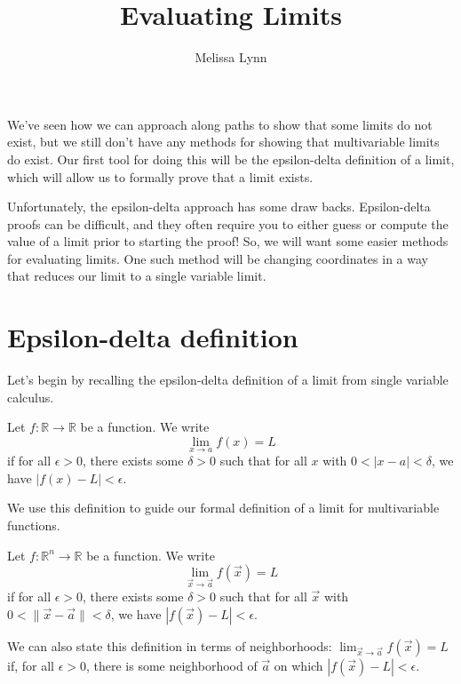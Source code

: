 \documentclass{ximera}
\title{Evaluating Limits}
\author{Melissa Lynn}
\begin{document}
\begin{abstract}
\end{abstract}
\maketitle

We've seen how we can approach along paths to show that some limits do not exist, but we still don't have any methods for showing that multivariable limits do exist. Our first tool for doing this will be the epsilon-delta definition of a limit, which will allow us to formally prove that a limit exists.

Unfortunately, the epsilon-delta approach has some draw backs. Epsilon-delta proofs can be difficult, and they often require you to either guess or compute the value of a limit prior to starting the proof! So, we will want some easier methods for evaluating limits. One such method will be changing coordinates in a way that reduces our limit to a single variable limit.

\section*{Epsilon-delta definition}

Let's begin by recalling the epsilon-delta definition of a limit from single variable calculus.

\begin{definition}
Let $f:\mathbb{R}\rightarrow\mathbb{R}$ be a function. We write
\[
\lim_{x\rightarrow a} f(x) = L
\]
if for all $\epsilon >0$, there exists some $\delta >0$ such that for all $x$ with $0 < |x-a| < \delta$, we have $|f(x)-L| < \epsilon$.
\end{definition}

We use this definition to guide our formal definition of a limit for multivariable functions.

\begin{definition}
Let $f:\mathbb{R}^n\rightarrow\mathbb{R}$ be a function. We write
\[
\lim_{\vec{x}\rightarrow \vec{a}} f(\vec{x}) = L
\]
if for all $\epsilon >0$, there exists some $\delta >0$ such that for all $\vec{x}$ with $0 < \|\vec{x}-\vec{a}\| < \delta$, we have $|f(\vec{x})-L| < \epsilon$.

We can also state this definition in terms of neighborhoods: $\lim_{\vec{x}\rightarrow \vec{a}} f(\vec{x}) = L$ if, for all $\epsilon>0$, there is some neighborhood of $\vec{a}$ on which $|f(\vec{x})-L| < \epsilon$.
\end{definition}
\end{document}
